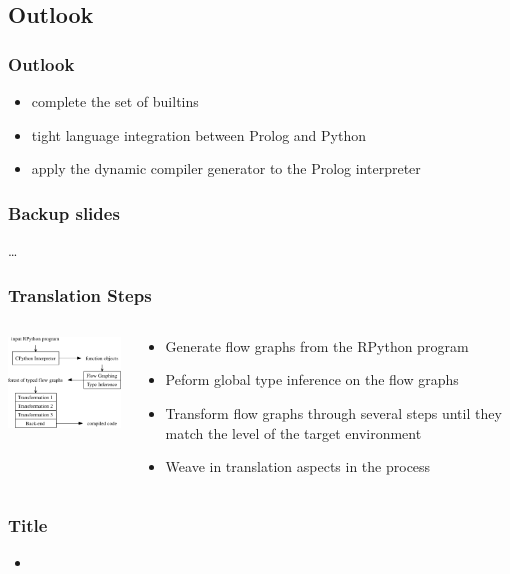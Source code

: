 \documentclass[utf8]{beamer}
\begin{document}
\subsection*{Outlook}
\begin{frame}
  \frametitle{Outlook}
  \begin{itemize}
  \item
    complete the set of builtins
  \item
    tight language integration between Prolog and Python
  \item
    apply the dynamic compiler generator to the Prolog interpreter
  \end{itemize}
\end{frame}

\begin{frame}
  \frametitle{Backup slides}
  \dots
\end{frame}

\begin{frame}
  \frametitle{Translation Steps}
  \begin{columns}[c]
  \begin{column}{5cm}
    \includegraphics[width=5cm]{image/arch.pdf}
  \end{column}
  \begin{column}{7cm}
  \begin{itemize}
    \item
      Generate flow graphs from the RPython program
    \item
      Peform global type inference on the flow graphs
    \item
      Transform flow graphs through several steps until they match the level of
      the target environment
    \item
      Weave in translation aspects in the process
  \end{itemize}
  \end{column}
  \end{columns}
\end{frame}

\begin{frame}
  \frametitle{Title}
  \begin{itemize}
  \item
  \end{itemize}
\end{frame}
\end{document}
